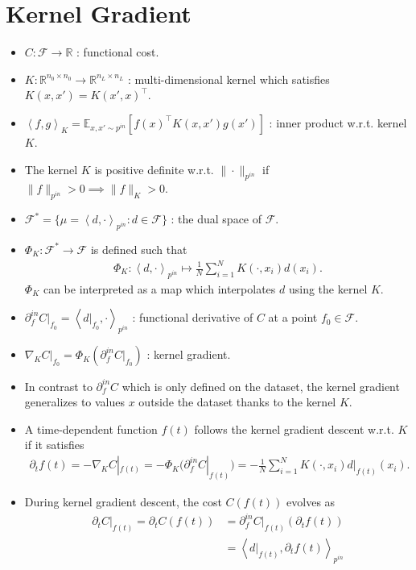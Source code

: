 \documentclass[10pt]{article}
\newcommand{\RR}{\mathbb{R}}
\newcommand{\EE}{\mathbb{E}}
\newcommand{\FF}{\mathcal{F}}
\newcommand{\inner}[2]{\left\langle #1, #2 \right\rangle}
\newcommand{\pin}{{p^{in}}}
\newcommand{\din}{\partial^{in}}
\begin{document}
\newpage

\section{Kernel Gradient}

\begin{itemize}
\item $C : \FF \rightarrow \RR$ : functional cost.
\item $K : \RR^{n_0 \times n_0} \rightarrow \RR^{n_L \times n_L}$ : multi-dimensional kernel which satisfies $K(x,x') = K(x',x)^\top$.
\item $\inner{f}{g}_K = \EE_{x,x' \sim \pin} [f(x)^\top K(x,x') g(x')]$ : inner product w.r.t. kernel $K$.
\item The kernel $K$ is positive definite w.r.t. $\|\cdot\|_{\pin}$ if $\|f\|_{\pin} > 0 \implies \|f\|_K > 0$.
\item $\FF^* = \{ \mu = \inner{d}{\cdot}_{\pin} : d \in \FF \}$ : the dual space of $\FF$.
\item $\Phi_K : \FF^* \rightarrow \FF$ is defined such that
\begin{align*}
\Phi_K : \inner{d}{\cdot}_{\pin} \mapsto \frac{1}{N} \sum_{i = 1}^N K(\cdot,x_i) d(x_i).
\end{align*}
$\Phi_K$ can be interpreted as a map which interpolates $d$ using the kernel $K$.
\item $\din_f C|_{f_0} = \inner{d|_{f_0}}{\cdot}_{\pin}$ : functional derivative of $C$ at a point $f_0 \in \FF$.
\item $\nabla_K C|_{f_0} = \Phi_K(\din_f C|_{f_0})$ : kernel gradient.
\item In contrast to $\din_f C$ which is only defined on the dataset, the kernel gradient generalizes to values $x$ outside the dataset thanks to the kernel $K$.
\item A time-dependent function $f(t)$ follows the kernel gradient descent w.r.t. $K$ if it satisfies
\begin{align*}
\partial_t f(t) = -\nabla_K C|_{f(t)} = - \Phi_K(\din_f C|_{f(t)}) = -\frac{1}{N} \sum_{i = 1}^N K(\cdot,x_i) d|_{f(t)}(x_i).
\end{align*}
\item During kernel gradient descent, the cost $C(f(t))$ evolves as
\begin{align*}
\partial_t C|_{f(t)} = \partial_t C(f(t)) &= \din_f C|_{f(t)}(\partial_t f(t)) \\
&= \inner{d|_{f(t)}}{\partial_t f(t)}_{\pin} \\

\end{align*}
\end{itemize}
\end{document}
